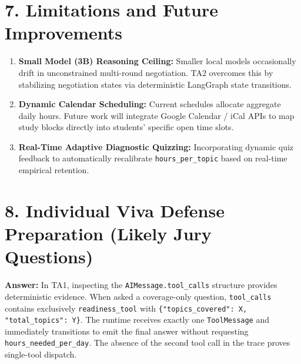 \documentclass[10pt,a4paper]{article}
\begin{document}
\section*{\large \color{primary} 7. Limitations and Future Improvements}
\vspace{-2pt}
\small
\begin{enumerate}[leftmargin=12pt]
  \item \textbf{Small Model (3B) Reasoning Ceiling:} Smaller local models occasionally drift in unconstrained multi-round negotiation. TA2 overcomes this by stabilizing negotiation states via deterministic LangGraph state transitions.
  \item \textbf{Dynamic Calendar Scheduling:} Current schedules allocate aggregate daily hours. Future work will integrate Google Calendar / iCal APIs to map study blocks directly into students' specific open time slots.
  \item \textbf{Real-Time Adaptive Diagnostic Quizzing:} Incorporating dynamic quiz feedback to automatically recalibrate \texttt{hours\_per\_topic} based on real-time empirical retention.
\end{enumerate}

\clearpage


\section*{\large \color{primary} 8. Individual Viva Defense Preparation (Likely Jury Questions)}
\vspace{-2pt}

\begin{tcolorbox}[basebox, colframe=primary, colback=lightbg, title={\textbf{\color{primary} Q1: What in the model's response tells you it decided it only needed one tool this time?}}]
\footnotesize
\textbf{Answer:} In TA1, inspecting the \texttt{AIMessage.tool\_calls} structure provides deterministic evidence. When asked a coverage-only question, \texttt{tool\_calls} contains exclusively \texttt{readiness\_tool} with \texttt{\{"topics\_covered": X, "total\_topics": Y\}}. The runtime receives exactly one \texttt{ToolMessage} and immediately transitions to emit the final answer without requesting \texttt{hours\_needed\_per\_day}. The absence of the second tool call in the trace proves single-tool dispatch.
\end{tcolorbox}
\end{document}
